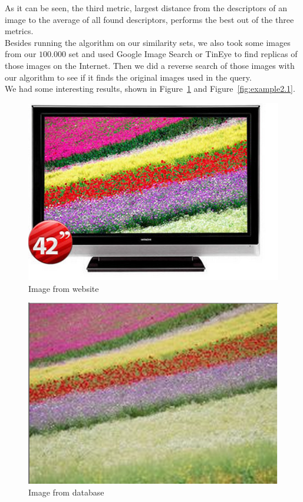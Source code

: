 \documentclass[conference]{IEEEtran}
\begin{document}
As it can be seen, the third metric, largest distance from the descriptors of an image to the average of all found descriptors, performs the best out of the three metrics.\\

Besides running the algorithm on our similarity sets, we also took some images from our $100.000$ set and used Google Image Search or TinEye to find replicas of those images on the Internet. Then we did a reverse search of those images with our algorithm to see if it finds the original images used in the query.\\
We had some interesting results, shown in Figure~\ref{fig:example1.1} and Figure~\ref{fig:example2.1}.\\

\begin{figure}[ht!]
\centering
\includegraphics[width=.6\linewidth]{images/fieldSite.png}
\caption{Image from website}
\label{fig:example1.1}
\end{figure}

\begin{figure}[ht!]
\centering
\includegraphics[width=.6\linewidth]{images/field.png}
\caption{Image from database}
\label{fig:example1.2}
\end{figure}
\end{document}
